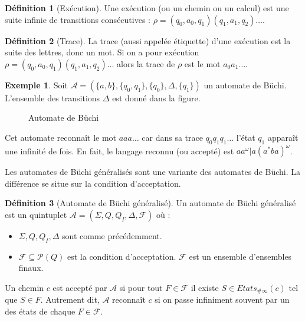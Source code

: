 \documentclass[12pt,a4paper]{article}
\theoremstyle{plain}
\theoremstyle{definition}
\newtheorem{defi}{Définition}
\newtheorem{ex}{Exemple}
\begin{document}
\begin{defi}[Exécution]
  Une exécution (ou un chemin ou un calcul) est une suite infinie de transitions consécutives : $\rho = (q_0,a_0,q_1)(q_1,a_1,q_2)\dots$.
\end{defi}

\begin{defi}[Trace]
  La trace (aussi appelée étiquette) d'une exécution est la suite des lettres, donc un mot.
  Si on a pour exécution $\rho = (q_0,a_0,q_1)(q_1,a_1,q_2)\dots$ alors la trace de $\rho$ est le mot $a_0a_1\dots$.
\end{defi}

\begin{ex}
  Soit $\mathcal{A}=(\{a,b\}, \{q_0, q_1\}, \{q_0\}, \Delta, \{q_1\})$ un automate de Büchi.
  L'ensemble des transitions $\Delta$ est donné dans la figure.
  \begin{figure}[h]
    \centering
    \caption{Automate de Büchi}
  \end{figure}
  
  Cet automate reconnaît le mot $aaa\dots$ car dans sa trace $q_0q_1q_1\dots$ l'état $q_1$ apparaît une infinité de fois.
  En fait, le langage reconnu (ou accepté) est $aa^\omega | a(a^*ba)^\omega$.
\end{ex}

Les automates de Büchi généralisés sont une variante des automates de Büchi.
La différence se situe sur la condition d'acceptation.
\begin{defi}[Automate de Büchi généralisé]
Un automate de Büchi généralisé est un quintuplet $\mathcal{A}=(\Sigma, Q, Q_I, \Delta, \mathscr{F})$ où :
  \begin{itemize}
  \item $\Sigma, Q, Q_I, \Delta$ sont comme précédemment.
  \item $\mathscr{F} \subseteq \mathcal{P}(Q)$ est la condition d'acceptation.
    $\mathscr{F}$ est un ensemble d'ensembles finaux.
  \end{itemize}

  Un chemin $c$ est accepté par $\mathcal{A}$ si pour tout $F \in \mathscr{F}$ il existe $S \in Etats_{\#\infty}(c)$ tel que $S \in F$.
  Autrement dit, $\mathcal{A}$ reconnaît $c$ si on passe infiniment souvent par un des états de chaque $F \in \mathscr{F}$.
\end{defi}
\end{document}
